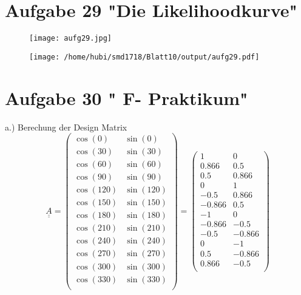 \section{Aufgabe 29 "Die Likelihoodkurve"}

\begin{figure}[ht]
   \centering
 \texttt{[image: aufg29.jpg]}
   \label{fig1}
\end{figure}


\begin{figure}
    \texttt{[image: /home/hubi/smd1718/Blatt10/output/aufg29.pdf]}
    \label{}
\end{figure}

\section{Aufgabe 30 " F- Praktikum"}
a.) Berechung der Design Matrix
$$
\underline{ \underline{A}}=
\begin{pmatrix}
    \cos(0) &\sin(0) \\
    \cos(30) &\sin(30) \\
    \cos(60) &\sin(60) \\
    \cos(90) &\sin(90) \\
    \cos(120) &\sin(120) \\
    \cos(150) &\sin(150) \\
    \cos(180) &\sin(180) \\
    \cos(210) &\sin(210) \\
    \cos(240) &\sin(240) \\
    \cos(270) &\sin(270) \\
    \cos(300) &\sin(300) \\
    \cos(330) &\sin(330) \\
\end{pmatrix}
=
\begin{pmatrix}
   1 &  0    \\
  0.866 &  0.5   \\
  0.5  & 0.866   \\
  0  & 1   \\
 -0.5  & 0.866   \\
 -0.866  & 0.5   \\
 -1  & 0   \\
 -0.866  &-0.5   \\
 -0.5  &-0.866   \\
 0  &-1   \\
  0.5  &-0.866   \\
  0.866  &-0.5   \\
\end{pmatrix}
$$
